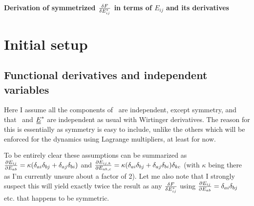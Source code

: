 \documentclass[11pt]{article}
\begin{document}
\begin{center}
    \LARGE
    \textbf{Derivation of symmetrized $\fdv{F}{E_{ij}^*}$ in terms of $E_{ij}$ and its derivatives}
\end{center}
\vspace{1em}
\section{Initial setup}
\subsection{Functional derivatives and independent variables}
Here I assume all the components of \EE\ are independent, except symmetry, and that \EE\ and $\du{E}^*$ are independent as usual with Wirtinger derivatives.
The reason for this is essentially as symmetry is easy to include, unlike the others which will be enforced for the dynamics using Lagrange multipliers, at least for now.

To be entirely clear these assumptions can be summarized as $\pdv{E_{ij}}{E_{ab}} = \kappa(\delta_{ai}\delta_{bj} + \delta_{aj}\delta_{bi})$ and $\pdv{E_{ij,k}}{E_{ab,c}} = \kappa(\delta_{ai}\delta_{bj} + \delta_{aj}\delta_{bi})\delta_{kc}$ (with $\kappa$ being there as I'm currently unsure about a factor of 2).
Let me also note that I strongly suspect this will yield exactly twice the result as any $\fdv{F}{E_{ij}^*}$ using $\pdv{E_{ij}}{E_{ab}}=\delta_{ai}\delta_{bj}$ etc. that happens to be symmetric.
\end{document}
